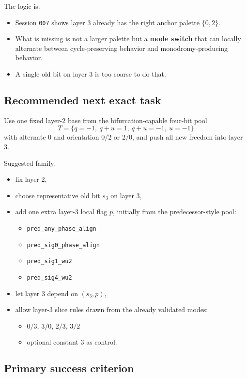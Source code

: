 \documentclass[11pt]{article}
\begin{document}
The logic is:
\begin{itemize}
    \item Session \texttt{007} shows layer 3 already has the right anchor palette $\{0,2\}$.
    \item What is missing is not a larger palette but a \textbf{mode switch} that can locally alternate between cycle-preserving behavior and monodromy-producing behavior.
    \item A single old bit on layer 3 is too coarse to do that.
\end{itemize}

\subsection*{Recommended next exact task}

Use one fixed layer-2 base from the bifurcation-capable four-bit pool
\[
T=\{q=-1,\ q+u=1,\ q+u=-1,\ u=-1\}
\]
with alternate $0$ and orientation $0/2$ or $2/0$, and push all new freedom into layer 3.

Suggested family:
\begin{itemize}
    \item fix layer 2,
    \item choose representative old bit $s_3$ on layer 3,
    \item add one extra layer-3 local flag $p$, initially from the predecessor-style pool:
    \begin{itemize}
        \item \texttt{pred\_any\_phase\_align}
        \item \texttt{pred\_sig0\_phase\_align}
        \item \texttt{pred\_sig1\_wu2}
        \item \texttt{pred\_sig4\_wu2}
    \end{itemize}
    \item let layer 3 depend on $(s_3,p)$,
    \item allow layer-3 slice rules drawn from the already validated modes:
    \begin{itemize}
        \item $0/3$, $3/0$, $2/3$, $3/2$
        \item optional constant $3$ as control.
    \end{itemize}
\end{itemize}

\subsection*{Primary success criterion}
\end{document}
